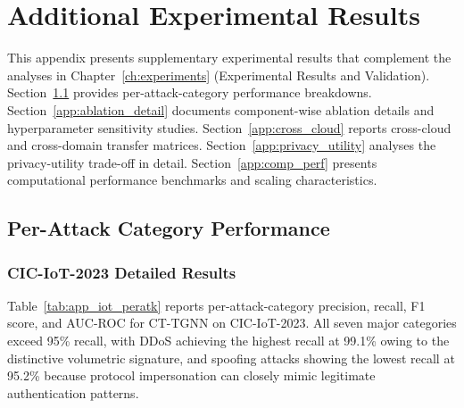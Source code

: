
\chapter{Additional Experimental Results}
\label{app:extra_results}

This appendix presents supplementary experimental results that complement the analyses in Chapter~\ref{ch:experiments} (Experimental Results and Validation). Section~\ref{app:per_attack} provides per-attack-category performance breakdowns. Section~\ref{app:ablation_detail} documents component-wise ablation details and hyperparameter sensitivity studies. Section~\ref{app:cross_cloud} reports cross-cloud and cross-domain transfer matrices. Section~\ref{app:privacy_utility} analyses the privacy-utility trade-off in detail. Section~\ref{app:comp_perf} presents computational performance benchmarks and scaling characteristics.


\section{Per-Attack Category Performance}
\label{app:per_attack}

\subsection{CIC-IoT-2023 Detailed Results}
\label{app:cicids_iot_detail}

Table~\ref{tab:app_iot_peratk} reports per-attack-category precision, recall, F1 score, and AUC-ROC for CT-TGNN on CIC-IoT-2023. All seven major categories exceed 95\% recall, with DDoS achieving the highest recall at 99.1\% owing to the distinctive volumetric signature, and spoofing attacks showing the lowest recall at 95.2\% because protocol impersonation can closely mimic legitimate authentication patterns.

